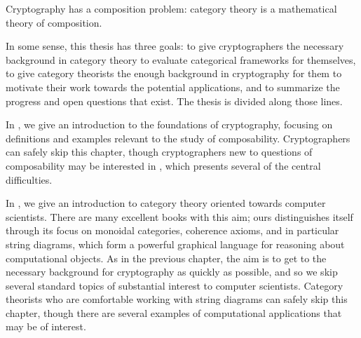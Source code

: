 

Cryptography has a composition problem: category theory is a mathematical theory
of composition.

In some sense, this thesis has three goals: to give cryptographers the necessary
background in category theory to evaluate categorical frameworks for themselves, to
give category theorists the enough background in cryptography for them to
motivate their work towards the potential applications, and to summarize the
progress and open questions that exist. The thesis is divided along those lines.

In , we give an introduction
to the foundations of cryptography, focusing on definitions and examples
relevant to the study of composability. Cryptographers can safely skip this
chapter, though cryptographers new to questions of composability may be
interested in , which
presents several of the central difficulties.

In , we give an
introduction to category theory oriented towards computer scientists. There are
many excellent books with this aim; ours distinguishes itself through its focus
on monoidal categories, coherence axioms, and in particular string diagrams,
which form a powerful graphical language for reasoning about computational
objects. As in the previous chapter, the aim is to get to the necessary
background for cryptography as quickly as possible, and so we skip several
standard topics of substantial interest to computer scientists. Category
theorists who are comfortable working with string diagrams can safely skip this
chapter, though there are several examples of computational applications that
may be of interest.
